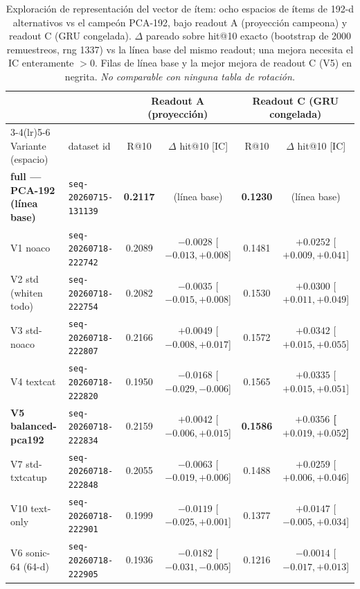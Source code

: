 \documentclass[11pt]{article}
\newcommand{\dsid}[1]{\texttt{\small #1}}
\newcommand{\best}[1]{\textbf{#1}}
\begin{document}
\begin{table}[ht]
  \centering
  \caption{Exploración de representación del vector de ítem: ocho espacios de ítems de
  192-d alternativos vs el campeón PCA-192, bajo readout A (proyección campeona) y readout
  C (GRU congelada). $\Delta$ pareado sobre hit@10 exacto (bootstrap de 2000 remuestreos,
  rng 1337) vs la línea base del mismo readout; una mejora necesita el IC enteramente $>0$.
  Filas de línea base y la mejor mejora de readout C (V5) en negrita. \emph{No comparable
  con ninguna tabla de rotación.}}
  \label{tab:nexttrack-representation}
  {\scriptsize\setlength{\tabcolsep}{3pt}\begin{tabular}{llcccc}
    \toprule
    & & \multicolumn{2}{c}{Readout A (proyección)} & \multicolumn{2}{c}{Readout C (GRU congelada)} \\
    \cmidrule(lr){3-4}\cmidrule(lr){5-6}
    Variante (espacio) & dataset id & R@10 & $\Delta$ hit@10 [IC] & R@10 & $\Delta$ hit@10 [IC] \\
    \midrule
    \best{full --- PCA-192 (línea base)} & \dsid{seq-20260715-131139} & \best{0.2117} & (línea base) & \best{0.1230} & (línea base) \\
    V1 noaco               & \dsid{seq-20260718-222742} & 0.2089 & $-0.0028$ [$-0.013,+0.008$] & 0.1481 & $+0.0252$ [$+0.009,+0.041$] \\
    V2 std (whiten todo)   & \dsid{seq-20260718-222754} & 0.2082 & $-0.0035$ [$-0.015,+0.008$] & 0.1530 & $+0.0300$ [$+0.011,+0.049$] \\
    V3 std-noaco           & \dsid{seq-20260718-222807} & 0.2166 & $+0.0049$ [$-0.008,+0.017$] & 0.1572 & $+0.0342$ [$+0.015,+0.055$] \\
    V4 textcat             & \dsid{seq-20260718-222820} & 0.1950 & $-0.0168$ [$-0.029,-0.006$] & 0.1565 & $+0.0335$ [$+0.015,+0.051$] \\
    \best{V5 balanced-pca192} & \dsid{seq-20260718-222834} & 0.2159 & $+0.0042$ [$-0.006,+0.015$] & \best{0.1586} & \best{$+0.0356$ [$+0.019,+0.052$]} \\
    V7 std-txtcatup        & \dsid{seq-20260718-222848} & 0.2055 & $-0.0063$ [$-0.019,+0.006$] & 0.1488 & $+0.0259$ [$+0.006,+0.046$] \\
    V10 text-only          & \dsid{seq-20260718-222901} & 0.1999 & $-0.0119$ [$-0.025,+0.001$] & 0.1377 & $+0.0147$ [$-0.005,+0.034$] \\
    V6 sonic-64 (64-d)     & \dsid{seq-20260718-222905} & 0.1936 & $-0.0182$ [$-0.031,-0.005$] & 0.1216 & $-0.0014$ [$-0.017,+0.013$] \\
    \bottomrule
  \end{tabular}}
\end{table}
\end{document}
